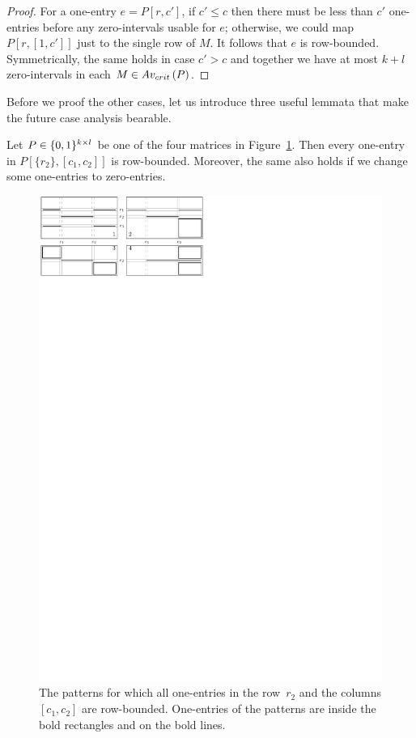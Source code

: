 \begin{proof}
For a one-entry $e=P[r,c']$, if $c'\leq c$ then there must be less than $c'$ one-entries before any zero-intervals usable for $e$; otherwise, we could map $P[r,[1,c']]$ just to the single row of $M$. It follows that $e$ is row-bounded. Symmetrically, the same holds in case $c'>c$ and together we have at most $k+l$ zero-intervals in each $M\in Av_{crit}\left(P\right)$.
\end{proof}

Before we proof the other cases, let us introduce three useful lemmata that make the future case analysis bearable.

\begin{lemma}
\label{lemma:H}
Let $P\in\{0,1\}^{k\times l}$ be one of the four matrices in Figure~\ref{fig:lemmaH}. Then every one-entry in $P[\{r_2\},[c_1,c_2]]$ is row-bounded. Moreover, the same also holds if we change some one-entries to zero-entries.

\begin{figure}[!ht]
\centering
\includegraphics[width=\textwidth]{img/lemmaH.pdf}
\caption{The patterns for which all one-entries in the row~$r_2$ and the columns $[c_1,c_2]$ are row-bounded. One-entries of the patterns are inside the bold rectangles and on the bold lines.}
\label{fig:lemmaH}
\end{figure}
\end{lemma}
